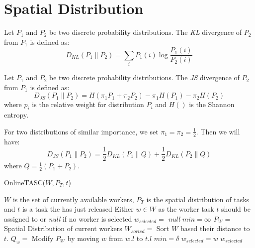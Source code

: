 \section{Spatial Distribution}

\begin{definition}
\label{def:KLD}
Let $P_1$ and $P_2$ be two discrete probability distributions. The \emph{KL} divergence of $P_2$ from $P_1$ is defined as:
\begin{equation*}
D_{KL}\left( P_1 \parallel P_2 \right) = \sum_i P_1(i) \log \frac{P_1(i)}{P_2(i)}
\end{equation*}
\end{definition}

\begin{definition}
Let $P_1$ and $P_2$ be two discrete probability distributions. The \emph{JS} divergence of $P_2$ from $P_1$ is defined as:
\begin{equation*}
D_{JS}\left( P_1 \parallel P_2 \right) = H \left( \pi_1P_1 + \pi_2P_2 \right) - \pi_1H\left( P_1 \right) - \pi_2H\left( P_2 \right)
\end{equation*}
where $p_i$ is the relative weight for distribution $P_i$ and $H()$ is the Shannon entropy.
\end{definition}

For two distributions of similar importance, we set $\pi_1 = \pi_2 = \frac{1}{2}$. Then we will have:
\begin{equation*}
D_{JS}\left( P_1 \parallel P_2 \right) = \frac{1}{2}D_{KL} \left( P_1 \parallel Q \right) + \frac{1}{2}D_{KL} \left( P_2 \parallel Q \right)
\end{equation*}
where $Q = \frac{1}{2} \left( P_1 + P_2 \right)$.

\begin{algorithm}
\caption{OnlineTASC($W, P_T, t$)}
\label{algo:OnlineTASC}
\begin{algorithmic}[1]
\REQUIRE $W$ is the set of currently available workers, $P_T$ is the spatial distribution of tasks and $t$ is a task the has just released
\ENSURE Either $w \in W$ as the worker task $t$ should be assigned to or \emph{null} if no worker is selected
\STATE $w_{selected} = $ \emph{null}
\STATE $min = \infty$
\STATE $P_W = $ Spatial Distribution of current workers
\STATE $W_{sorted} = $ Sort $W$ based their distance to $t$.
		\STATE $Q_w = $ Modify $P_W$ by moving $w$ from $w.l$ to $t.l$
			\STATE $min = \delta$
			\STATE $w_{selected} = w$
		\ENDIF
	\ENDIF
\ENDFOR
\RETURN $w_{selected}$
\end{algorithmic}
\end{algorithm}
